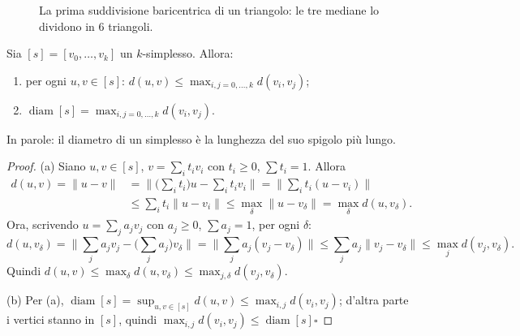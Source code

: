 \begin{figure}[H]
    \centering
    \caption{La prima suddivisione baricentrica di un triangolo: le tre mediane lo dividono in $6$ triangoli.}
\end{figure}

\begin{prop}
Sia $[s] = [v_0, \dots, v_k]$ un $k$-simplesso. Allora:
\begin{enumerate}
    \item[(a)] per ogni $u, v \in [s]$: $d(u,v) \leqslant \max_{i,j = 0, \dots, k} d(v_i, v_j)$;
    \item[(b)] $\operatorname{diam}[s] = \max_{i,j = 0, \dots, k} d(v_i, v_j)$.
\end{enumerate}
In parole: il diametro di un simplesso \`e la lunghezza del suo spigolo pi\`u lungo.
\end{prop}
\begin{proof}
(a) Siano $u, v \in [s]$, $v = \sum_i t_i v_i$ con $t_i \geqslant 0$, $\sum t_i = 1$. Allora
\[
\begin{aligned}
d(u,v) = \|u - v\| &= \Big\| \Big(\sum_i t_i\Big) u - \sum_i t_i v_i \Big\| = \Big\| \sum_i t_i (u - v_i) \Big\| \\
&\leqslant \sum_i t_i \|u - v_i\| \leqslant \max_\delta \|u - v_\delta\| = \max_\delta d(u, v_\delta).
\end{aligned}
\]
Ora, scrivendo $u = \sum_j a_j v_j$ con $a_j \geqslant 0$, $\sum a_j = 1$, per ogni $\delta$:
\[
d(u, v_\delta) = \Big\| \sum_j a_j v_j - \Big(\sum_j a_j\Big) v_\delta \Big\| = \Big\| \sum_j a_j (v_j - v_\delta) \Big\| \leqslant \sum_j a_j \|v_j - v_\delta\| \leqslant \max_j d(v_j, v_\delta).
\]
Quindi $d(u, v) \leqslant \max_\delta d(u, v_\delta) \leqslant \max_{j, \delta} d(v_j, v_\delta)$.

(b) Per (a), $\operatorname{diam}[s] = \sup_{u,v \in [s]} d(u,v) \leqslant \max_{i,j} d(v_i, v_j)$; d'altra parte i vertici stanno in $[s]$, quindi $\max_{i,j} d(v_i, v_j) \leqslant \operatorname{diam}[s]$\hfill$\square$
\end{proof}

